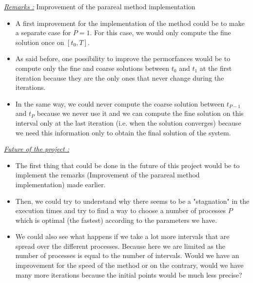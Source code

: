 \noindent \underline{\textit{Remarks :}} Improvement of the parareal method implementation 

\begin{itemize}[label=-]
	\item A first improvement for the implementation of the method could be to make a separate case for $P=1$. For this case, we would only compute the fine solution once on $[t_0,T]$.
	\item As said before, one possibility to improve the permorfances would be to compute only the fine and coarse solutions between $t_0$ and $t_1$ at the first iteration because they are the only ones that never change during the iterations. 
	\item In the same way, we could never compute the coarse solution between $t_{P-1}$ and $t_P$ because we never use it and we can compute the fine solution on this interval only at the last iteration (i.e. when the solution converges) because we need this information only to obtain the final solution of the system.
\end{itemize}

\noindent \underline{\textit{Future of the project :}}

\begin{itemize}[label=-]
	\item The first thing that could be done in the future of this project would be to implement the remarks (Improvement of the parareal method implementation) made earlier.
	\item Then, we could try to understand why there seems to be a "stagnation" in the execution times and try to find a way to choose a number of processes $P$ which is optimal (the fastest) according to the parameters we have.
	\item We could also see what happens if we take a lot more intervals that are spread over the different processes. Because here we are limited as the number of processes is equal to the number of intervals. Would we have an improvement for the speed of the method or on the contrary, would we have many more iterations because the initial points would be much less precise?
\end{itemize}